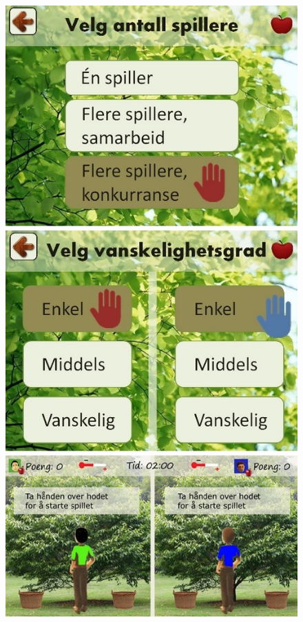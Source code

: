 \begin{figure} [H]
\centering
\includegraphics[scale=0.45]{menuStep4.jpg}
\label{app:menu2Norsk}
\end{figure}

